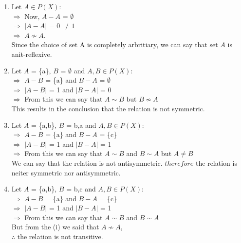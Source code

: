 \documentclass{article}
\begin{document}
\begin{enumerate}
\begin{enumerate}
\begin{enumerate}
        \item Let $A \in P(X)$:\\
              $\Rightarrow$ Now, $A - A$ = $\emptyset$\\
              $\Rightarrow$ $\left\lvert A - A\right\rvert$ = 0 $\neq 1$\\
              $\Rightarrow$ $A \nsim A$.\\
              Since the choice of set A is completely arbritiary, we can say that set $A$ is 
              anit-reflexive.\\

        \item Let $A$ = \{a\}, $B$ = $\emptyset$ and $A,B \in P(X)$:\\
             $\Rightarrow$ $A-B$ = \{a\} and $B-A$ = $\emptyset$\\
             $\Rightarrow$ $\left\lvert A - B\right\rvert$ = 1 and $\left\lvert B - A\right\rvert$ = 0\\
             $\Rightarrow$ From this we can say that $A \sim B$ but $B \nsim A$\\
             This results in the conclusion that the relation is not symmetric.\\

        \item Let $A$ = \{a,b\}, $B$ = {b,a} and $A,B \in P(X)$:\\
             $\Rightarrow$ $A-B$ = \{a\} and $B-A$ = \{c\} \\
             $\Rightarrow$ $\left\lvert A - B\right\rvert$ = 1 and $\left\lvert B - A\right\rvert$ = 1\\
             $\Rightarrow$ From this we can say that $A \sim B$ and $B \sim A$ but $A \neq B$\\
             We can say that the relation is not antisymmetric. $therefore$ the relation is 
             neiter symmetric nor antisymmetric.\\

        \item Let $A$ = \{a,b\}, $B$ = {b,c} and $A,B \in P(X)$:\\
             $\Rightarrow$ $A-B$ = \{a\} and $B-A$ = \{c\} \\
             $\Rightarrow$ $\left\lvert A - B\right\rvert$ = 1 and $\left\lvert B - A\right\rvert$ = 1\\
             $\Rightarrow$ From this we can say that $A \sim B$ and $B \sim A$\\
             But from the (i) we said that $A \nsim A$,\\ $\therefore$ the relation is not transitive.
            \end{enumerate}


\end{enumerate}
\end{enumerate}
\end{document}
